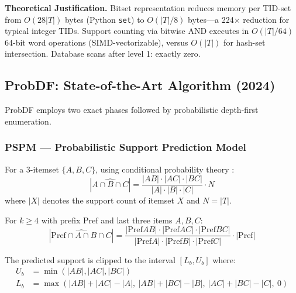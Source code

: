 \documentclass[conference]{IEEEtran}
\begin{document}
\noindent\textbf{Theoretical Justification.}
Bitset representation reduces memory per TID-set from $O(28|T|)$ bytes
(Python \texttt{set}) to $O(|T|/8)$ bytes---a 224$\times$ reduction for
typical integer TIDs. Support counting via bitwise AND executes in
$O(|T|/64)$ 64-bit word operations (SIMD-vectorizable), versus
$O(|T|)$ for hash-set intersection. Database scans after level 1:
exactly zero.

\subsection{ProbDF: State-of-the-Art Algorithm (2024)}

ProbDF \cite{probdf2024} employs two exact phases followed by
probabilistic depth-first enumeration.

\subsubsection{PSPM --- Probabilistic Support Prediction Model}

For a 3-itemset $\{A, B, C\}$, using conditional probability theory
\cite{probdf2024}:
\begin{equation}
  |\hat{A \cap B \cap C}| =
    \frac{|AB| \cdot |AC| \cdot |BC|}{|A| \cdot |B| \cdot |C|} \cdot N
  \label{eq:pspm3}
\end{equation}
where $|X|$ denotes the support count of itemset $X$ and $N = |T|$.

For $k \geq 4$ with prefix $\text{Pref}$ and last three items $A, B, C$:
\begin{equation}
  |\widehat{\text{Pref} \cap A \cap B \cap C}| =
    \frac{|\text{Pref}AB| \cdot |\text{Pref}AC| \cdot |\text{Pref}BC|}
         {|\text{Pref}A| \cdot |\text{Pref}B| \cdot |\text{Pref}C|}
    \cdot |\text{Pref}|
  \label{eq:pspm4}
\end{equation}

The predicted support is clipped to the interval $[L_b, U_b]$ where:
\begin{align}
  U_b &= \min(|AB|, |AC|, |BC|) \label{eq:ub} \\
  L_b &= \max(|AB|+|AC|-|A|,\ |AB|+|BC|-|B|,\ |AC|+|BC|-|C|,\ 0)
  \label{eq:lb}
\end{align}
\end{document}
